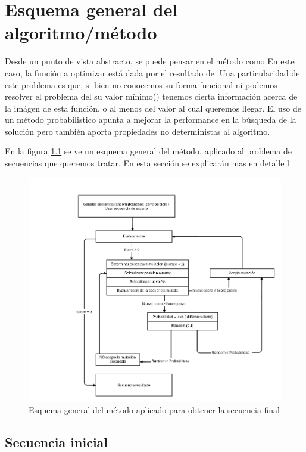 \chapter{Esquema general del algoritmo/método}

Desde un punto de vista abstracto, se puede pensar en el método como
En este caso, la función a optimizar está dada por el resultado de  .Una particularidad de este problema es que, 
si bien no conocemos su forma funcional ni podemos resolver el problema del su valor mínimo() 
tenemos cierta información acerca de la imágen de esta función, o al menos del valor al cual queremos llegar.
El uso de un método probabilistico apunta a mejorar la performance en la búsqueda de la solución pero también aporta propiedades no deterministas al algoritmo.

En la figura \ref{fig:esquema-algoritmo} se ve un esquema general del método, aplicado al problema de secuencias que queremos tratar. En esta sección se explicarán mas en detalle l

\begin{figure}[htbp]
\centering
   \includegraphics[width=\textwidth]{img/diagrama-algoritmo.png}
 \caption{Esquema general del método aplicado para obtener la secuencia final}
 \label{fig:esquema-algoritmo}
\end{figure}


\section{Secuencia inicial}


